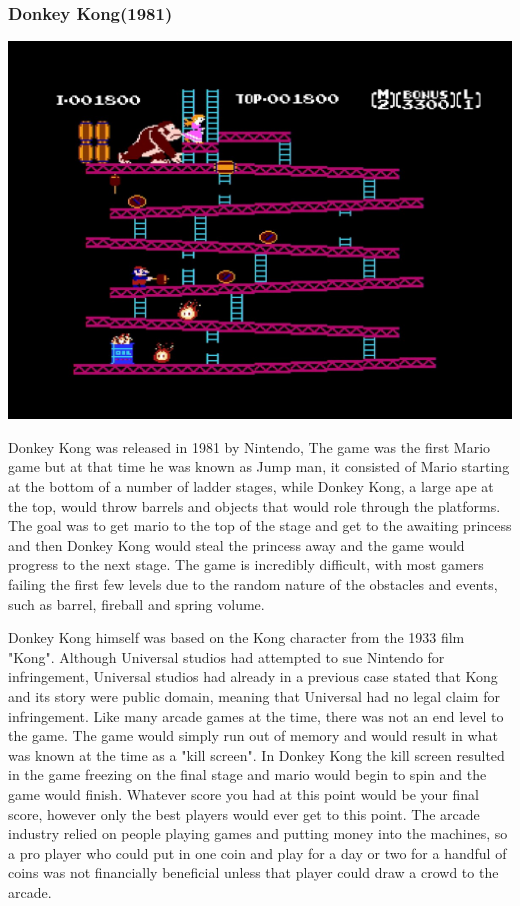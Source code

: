 \documentclass{article}
\begin{document}
\subsubsection{Donkey Kong(1981)}
\begin{minipage}{0.4\textwidth}
\includegraphics[width=\linewidth]{donkeykong}
\end{minipage} \hfill
\begin{minipage}{0.55\textwidth}\raggedright
Donkey Kong was released in 1981 by Nintendo, The game was the first Mario game but at that time he was known as Jump man, it consisted of Mario starting at the bottom of a number of ladder stages, while Donkey Kong, a large ape at the top, would throw barrels and objects that would role through the platforms. The goal was to get mario to the top of the stage and get to the awaiting princess and then Donkey Kong would steal the princess away and the game would progress to the next stage. The game is incredibly difficult, with most gamers failing the first few levels due to the random nature of the obstacles and events, such as barrel, fireball and spring volume.
\end{minipage} \newline
Donkey Kong himself was based on the Kong character from the 1933 film "Kong". Although Universal studios had attempted to sue Nintendo for infringement, Universal studios had already in a previous case stated that Kong and its story were public domain, meaning that Universal had no legal claim for infringement. Like many arcade games at the time, there was not an end level to the game. The game would simply run out of memory and would result in what was known at the time as a "kill screen". In Donkey Kong the kill screen resulted in the game freezing on the final stage and mario would begin to spin and the game would finish. Whatever score you had at this point would be your final score, however only the best players would ever get to this point. The arcade industry relied on people playing games and putting money into the machines, so a pro player who could put in one coin and play for a day or two for a handful of coins was not financially beneficial unless that player could draw a crowd to the arcade. \newline \newline
\end{document}
